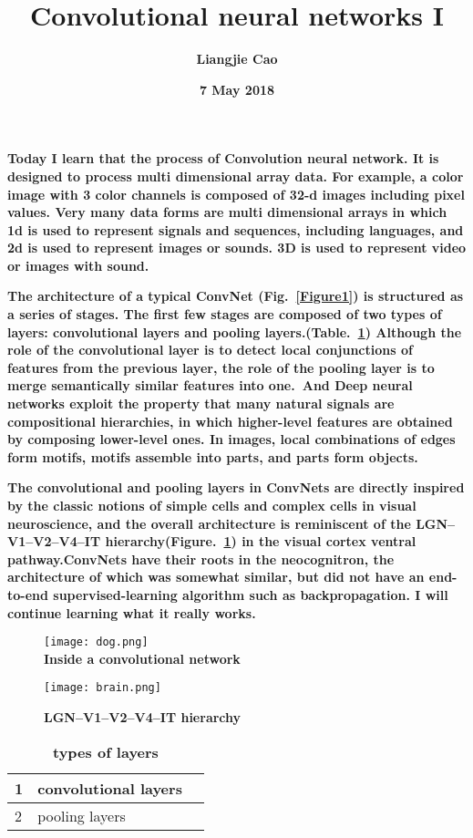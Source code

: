 \documentclass[35pt]{article}
\begin{document}
\title{\textbf{Convolutional neural networks I}}
\author{\textbf{Liangjie Cao}}
\date{\textbf{7 May 2018}}
\maketitle
\par
\textbf{Today I learn that the process of Convolution neural network. It is designed to process multi dimensional array data. For example, a color image with 3 color channels is composed of 32-d images including pixel values. Very many data forms are multi dimensional arrays in which 1d is used to represent signals and sequences, including languages, and 2d is used to represent images or sounds. 3D is used to represent video or images with sound.}\\
\par
\textbf{The architecture of a typical ConvNet (Fig.~\ref{Figure1}) is structured as a series of stages. The first few stages are composed of two types of layers: convolutional layers and pooling layers.(Table.~\ref{Table}) Although the role of the convolutional layer is to detect local conjunctions of features from the previous layer, the role of the pooling layer is to merge semantically similar features into one.~\cite{name1}And Deep neural networks exploit the property that many natural signals are compositional hierarchies, in which higher-level features are obtained by composing lower-level ones. In images, local combinations of edges form motifs, motifs assemble into parts, and parts form objects.}
\\
\par
\textbf{The convolutional and pooling layers in ConvNets are directly inspired by the classic notions of simple cells and complex cells in visual neuroscience, and the overall architecture is reminiscent of the LGN–V1–V2–V4–IT hierarchy(Figure.~\ref{Figure2}) in the visual cortex ventral pathway.ConvNets have their roots in the neocognitron, the architecture of which was somewhat similar, but did not have an end-to-end supervised-learning algorithm such as backpropagation. I will continue learning what it really works.}\\
\onecolumn
 \begin{figure}[ht]
 \centering
 \texttt{[image: dog.png]}\\
 \caption{\textbf{Inside a convolutional network}}\label{Figure1}
 \centering
 \texttt{[image: brain.png]}\\
 \caption{\textbf{LGN–V1–V2–V4–IT hierarchy}}\label{Figure2}
\end{figure}
\begin{table}[!htbp]
  \centering
 \begin{tabular}{|p{2cm}|p{2cm}|p{2cm}}
   \hline
     1 & convolutional layers\\
  \hline
     2 & pooling layers\\
   \hline
  \end{tabular}
  \caption{\textbf{types of layers}} \label{Table}
  \end{table}


\end{document}

